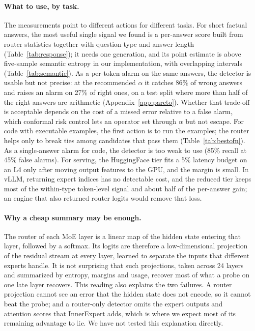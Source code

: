 \documentclass[11pt]{article}
\begin{document}
\paragraph{What to use, by task.}
The measurements point to different actions for different tasks.
For short factual answers, the most useful single signal we found is a per-answer score built from router statistics together with question type and answer length (Table~\ref{tab:response}); it needs one generation, and its point estimate is above five-sample semantic entropy in our implementation, with overlapping intervals (Table~\ref{tab:semantic}).
As a per-token alarm on the same answers, the detector is usable but not precise: at the recommended $\alpha$ it catches 86\% of wrong answers and raises an alarm on 27\% of right ones, on a test split where more than half of the right answers are arithmetic (Appendix~\ref{app:pareto}).
Whether that trade-off is acceptable depends on the cost of a missed error relative to a false alarm, which conformal risk control lets an operator set through $\alpha$ but not escape.
For code with executable examples, the first action is to run the examples; the router helps only to break ties among candidates that pass them (Table~\ref{tab:bestofn}).
As a single-answer alarm for code, the detector is too weak to use (85\% recall at 45\% false alarms).
For serving, the HuggingFace tier fits a 5\% latency budget on an L4 only after moving output features to the GPU, and the margin is small.
In vLLM, returning expert indices has no detectable cost, and the reduced tier keeps most of the within-type token-level signal and about half of the per-answer gain; an engine that also returned router logits would remove that loss.

\paragraph{Why a cheap summary may be enough.}
The router of each MoE layer is a linear map of the hidden state entering that layer, followed by a softmax.
Its logits are therefore a low-dimensional projection of the residual stream at every layer, learned to separate the inputs that different experts handle.
It is not surprising that such projections, taken across 24 layers and summarized by entropy, margins and usage, recover most of what a probe on one late layer recovers.
This reading also explains the two failures.
A router projection cannot see an error that the hidden state does not encode, so it cannot beat the probe; and a router-only detector omits the expert outputs and attention scores that InnerExpert adds, which is where we expect most of its remaining advantage to lie.
We have not tested this explanation directly.
\end{document}
